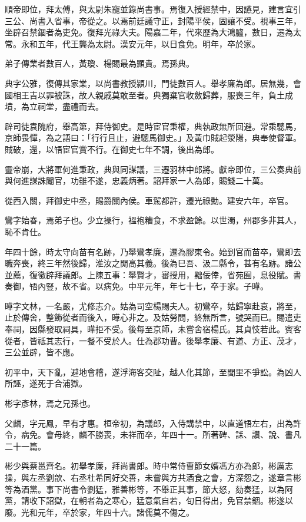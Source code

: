 \begin{pinyinscope}
順帝即位，拜太傅，與太尉朱寵並錄尚書事。焉復入授經禁中，因讌見，建言宜引三公、尚書入省事，帝從之。以焉前廷議守正，封陽平侯，固讓不受。視事三年，坐辟召禁錮者為吏免。復拜光祿大夫。陽嘉二年，代來歷為大鴻臚，數日，遷為太常。永和五年，代王龔為太尉。漢安元年，以日食免。明年，卒於家。

弟子傳業者數百人，黃瓊、楊賜最為顯貴。焉孫典。

典字公雅，復傳其家業，以尚書教授潁川，門徒數百人。舉孝廉為郎。居無幾，會國相王吉以罪被誅，故人親戚莫敢至者。典獨棄官收斂歸葬，服喪三年，負土成墳，為立祠堂，盡禮而去。

辟司徒袁隗府，舉高第，拜侍御史。是時宦官秉權，典執政無所回避。常乘驄馬，京師畏憚，為之語曰：「行行且止，避驄馬御史。」及黃巾賊起滎陽，典奉使督軍。賊破，還，以啎宦官賞不行。在御史七年不調，後出為郎。

靈帝崩，大將軍何進秉政，典與同謀議，三遷羽林中郎將。獻帝即位，三公奏典前與何進謀誅閹官，功雖不遂，忠義炳著。詔拜家一人為郎，賜錢二十萬。

從西入關，拜御史中丞，賜爵關內侯。車駕都許，遷光祿勳。建安六年，卒官。

鸞字始春，焉弟子也。少立操行，褞袍糟食，不求盈餘。以世濁，州郡多非其人，恥不肯仕。

年四十餘，時太守向苗有名跡，乃舉鸞孝廉，遷為膠東令。始到官而苗卒，鸞即去職奔喪，終三年然後歸，淮汝之閒高其義。後為巳吾、汲二縣令，甚有名跡。諸公並薦，復徵辟拜議郎。上陳五事：舉賢才，審授用，黜佞倖，省苑囿，息役賦。書奏御，啎內豎，故不省。以病免。中平元年，年七十七，卒于家。子曄。

曄字文林，一名嚴，尤修志介。姑為司空楊賜夫人。初鸞卒，姑歸寧赴哀，將至，止於傳舍，整飾從者而後入，曄心非之。及姑勞問，終無所言，號哭而已。賜遣吏奉祠，因縣發取祠具，曄拒不受。後每至京師，未嘗舍宿楊氏。其貞忮若此。賓客從者，皆祗其志行，一餐不受於人。仕為郡功曹。後舉孝廉、有道、方正、茂才，三公並辟，皆不應。

初平中，天下亂，避地會稽，遂浮海客交阯，越人化其節，至閭里不爭訟。為凶人所誣，遂死于合浦獄。

彬字彥林，焉之兄孫也。

父麟，字元鳳，早有才惠。桓帝初，為議郎，入侍講禁中，以直道啎左右，出為許令，病免。會母終，麟不勝喪，未祥而卒，年四十一。所著碑、誄、讚、說、書凡二十一篇。

彬少與蔡邕齊名。初舉孝廉，拜尚書郎。時中常侍曹節女婿馮方亦為郎，彬厲志操，與左丞劉歆、右丞杜希同好交善，未嘗與方共酒食之會，方深怨之，遂章言彬等為酒黨。事下尚書令劉猛，雅善彬等，不舉正其事，節大怒，劾奏猛，以為阿黨，請收下詔獄，在朝者為之寒心，猛意氣自若，旬日得出，免官禁錮。彬遂以廢。光和元年，卒於家，年四十六。諸儒莫不傷之。


\end{pinyinscope}
